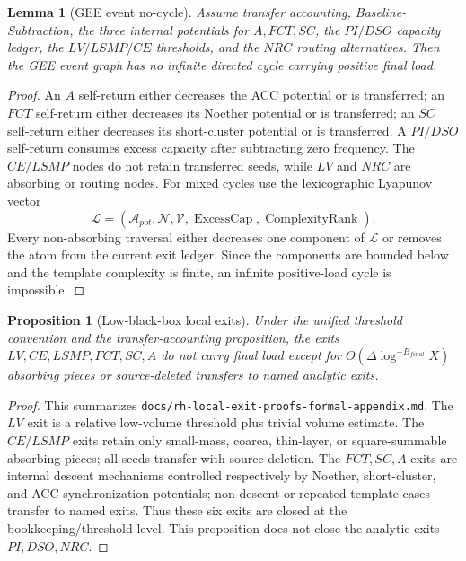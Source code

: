 \documentclass[11pt]{article}
\newtheorem{proposition}[theorem]{Proposition}
\newtheorem{lemma}[theorem]{Lemma}
\theoremstyle{definition}
\begin{document}
\begin{lemma}[GEE event no-cycle]\label{lem:gee-cycle}
Assume transfer accounting, Baseline-Subtraction, the three internal potentials for $A,FCT,SC$, the $PI/DSO$ capacity ledger, the $LV/LSMP/CE$ thresholds, and the $NRC$ routing alternatives.  Then the GEE event graph has no infinite directed cycle carrying positive final load.
\end{lemma}
\begin{proof}
An $A$ self-return either decreases the ACC potential or is transferred; an $FCT$ self-return either decreases its Noether potential or is transferred; an $SC$ self-return either decreases its short-cluster potential or is transferred.  A $PI/DSO$ self-return consumes excess capacity after subtracting zero frequency.  The $CE/LSMP$ nodes do not retain transferred seeds, while $LV$ and $NRC$ are absorbing or routing nodes.  For mixed cycles use the lexicographic Lyapunov vector
\[
  \mathcal L=(\mathcal A_{pot},\mathcal N,\mathcal V,\operatorname{ExcessCap},\operatorname{ComplexityRank}).
\]
Every non-absorbing traversal either decreases one component of $\mathcal L$ or removes the atom from the current exit ledger.  Since the components are bounded below and the template complexity is finite, an infinite positive-load cycle is impossible.
\end{proof}


\begin{proposition}[Low-black-box local exits]
Under the unified threshold convention and the transfer-accounting proposition, the exits $LV,CE,LSMP,FCT,SC,A$ do not carry final load except for $O(\Delta\log^{-B_{final}}X)$ absorbing pieces or source-deleted transfers to named analytic exits.
\end{proposition}
\begin{proof}
This summarizes \texttt{docs/rh-local-exit-proofs-formal-appendix.md}.  The $LV$ exit is a relative low-volume threshold plus trivial volume estimate.  The $CE/LSMP$ exits retain only small-mass, coarea, thin-layer, or square-summable absorbing pieces; all seeds transfer with source deletion.  The $FCT,SC,A$ exits are internal descent mechanisms controlled respectively by Noether, short-cluster, and ACC synchronization potentials; non-descent or repeated-template cases transfer to named exits.  Thus these six exits are closed at the bookkeeping/threshold level.  This proposition does not close the analytic exits $PI,DSO,NRC$.
\end{proof}
\end{document}
